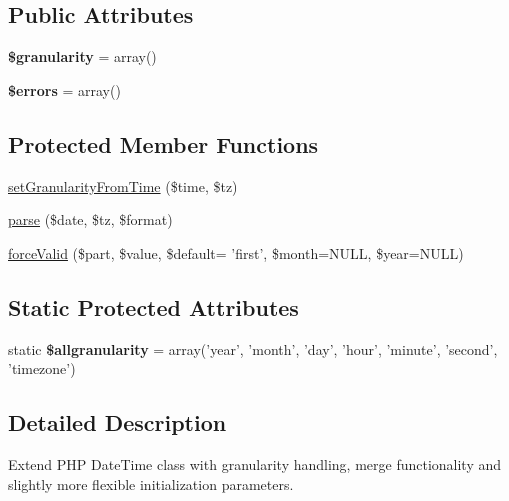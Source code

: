 \subsection*{Public Attributes}
\begin{DoxyCompactItemize}
\item 
\hypertarget{classDateObject_a06ca53202c51f234c64a9a60fe2febf7}{
{\bfseries \$granularity} = array()}
\label{classDateObject_a06ca53202c51f234c64a9a60fe2febf7}

\item 
\hypertarget{classDateObject_aac238b35e22ef08a8d9d4c3d274be1f2}{
{\bfseries \$errors} = array()}
\label{classDateObject_aac238b35e22ef08a8d9d4c3d274be1f2}

\end{DoxyCompactItemize}
\subsection*{Protected Member Functions}
\begin{DoxyCompactItemize}
\item 
\hyperlink{classDateObject_af37aa470a0a1debd8a1b46c0dbaf843f}{setGranularityFromTime} (\$time, \$tz)
\item 
\hyperlink{classDateObject_a46f98ee14391ce5aff22406b65858949}{parse} (\$date, \$tz, \$format)
\item 
\hyperlink{classDateObject_a6dfed6663a0da8662e3cbfa1886d8396}{forceValid} (\$part, \$value, \$default= 'first', \$month=NULL, \$year=NULL)
\end{DoxyCompactItemize}
\subsection*{Static Protected Attributes}
\begin{DoxyCompactItemize}
\item 
\hypertarget{classDateObject_a92f733e719f64037b1542ee9eb505198}{
static {\bfseries \$allgranularity} = array('year', 'month', 'day', 'hour', 'minute', 'second', 'timezone')}
\label{classDateObject_a92f733e719f64037b1542ee9eb505198}

\end{DoxyCompactItemize}


\subsection{Detailed Description}
Extend PHP DateTime class with granularity handling, merge functionality and slightly more flexible initialization parameters.

